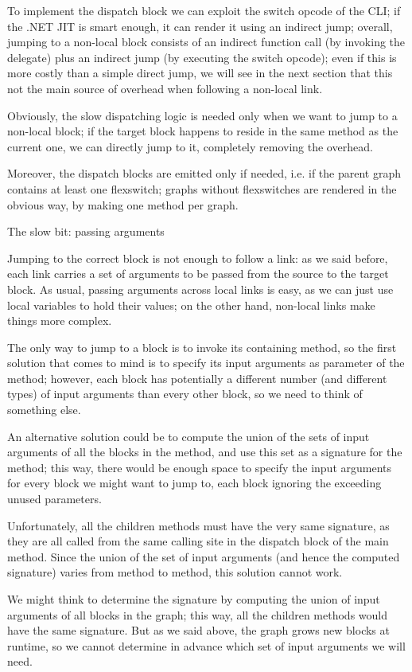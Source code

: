 {To implement the dispatch block we can exploit the switch opcode of the CLI; if the .NET JIT is smart enough, it can render it using an indirect jump; overall, jumping to a non-local block consists of an indirect function call (by invoking the delegate) plus an indirect jump (by executing the switch opcode); even if this is more costly than a simple direct jump, we will see in the next section that this not the main source of overhead when following a non-local link.

Obviously, the slow dispatching logic is needed only when we want to jump to a non-local block; if the target block happens to reside in the same method as the current one, we can directly jump to it, completely removing the overhead.

Moreover, the dispatch blocks are emitted only if needed, i.e. if the parent graph contains at least one flexswitch; graphs without flexswitches are rendered in the obvious way, by making one method per graph.

The slow bit: passing arguments

Jumping to the correct block is not enough to follow a link: as we said before, each link carries a set of arguments to be passed from the source to the target block. As usual, passing arguments across local links is easy, as we can just use local variables to hold their values; on the other hand, non-local links make things more complex.

The only way to jump to a block is to invoke its containing method, so the first solution that comes to mind is to specify its input arguments as parameter of the method; however, each block has potentially a different number (and different types) of input arguments than every other block, so we need to think of something else.

An alternative solution could be to compute the union of the sets of input arguments of all the blocks in the method, and use this set as a signature for the method; this way, there would be enough space to specify the input arguments for every block we might want to jump to, each block ignoring the exceeding unused parameters.

Unfortunately, all the children methods must have the very same signature, as they are all called from the same calling site in the dispatch block of the main method. Since the union of the set of input arguments (and hence the computed signature) varies from method to method, this solution cannot work.

We might think to determine the signature by computing the union of input arguments of all blocks in the graph; this way, all the children methods would have the same signature. But as we said above, the graph grows new blocks at runtime, so we cannot determine in advance which set of input arguments we will need.

}
